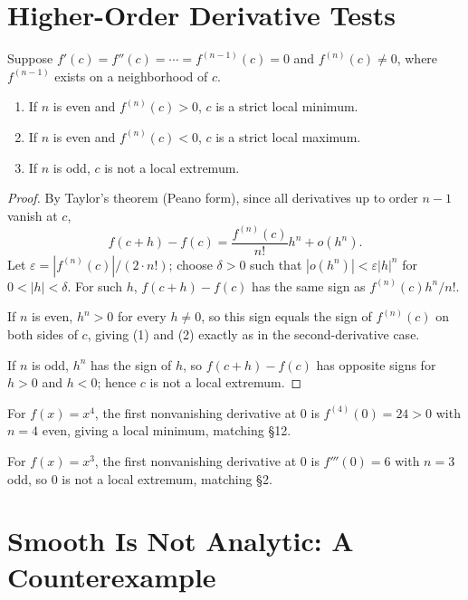 \documentclass{essay}
\begin{document}
\section{Higher-Order Derivative Tests}

\begin{theorem}
Suppose \(f'(c)=f''(c)=\cdots=f^{(n-1)}(c)=0\) and \(f^{(n)}(c)\neq0\),
where \(f^{(n-1)}\) exists on a neighborhood of \(c\).
\begin{enumerate}
    \item If \(n\) is even and \(f^{(n)}(c)>0\), \(c\) is a strict local
    minimum.
    \item If \(n\) is even and \(f^{(n)}(c)<0\), \(c\) is a strict local
    maximum.
    \item If \(n\) is odd, \(c\) is not a local extremum.
\end{enumerate}
\end{theorem}

\begin{proof}
By Taylor's theorem (Peano form), since all derivatives up to order
\(n-1\) vanish at \(c\),
\[
f(c+h)-f(c)=\frac{f^{(n)}(c)}{n!}h^n+o(h^n).
\]
Let \(\varepsilon=|f^{(n)}(c)|/(2\cdot n!)\); choose \(\delta>0\) such that
\(|o(h^n)|<\varepsilon|h|^n\) for \(0<|h|<\delta\). For such \(h\),
\(f(c+h)-f(c)\) has the same sign as \(f^{(n)}(c)h^n/n!\).

If \(n\) is even, \(h^n>0\) for every \(h\neq0\), so this sign equals the
sign of \(f^{(n)}(c)\) on both sides of \(c\), giving (1) and (2) exactly
as in the second-derivative case.

If \(n\) is odd, \(h^n\) has the sign of \(h\), so \(f(c+h)-f(c)\) has
opposite signs for \(h>0\) and \(h<0\); hence \(c\) is not a local
extremum.
\end{proof}

\begin{example}
For \(f(x)=x^4\), the first nonvanishing derivative at \(0\) is
\(f^{(4)}(0)=24>0\) with \(n=4\) even, giving a local minimum, matching
\S 12.
\end{example}

\begin{example}
For \(f(x)=x^3\), the first nonvanishing derivative at \(0\) is
\(f'''(0)=6\) with \(n=3\) odd, so \(0\) is not a local extremum, matching
\S 2.
\end{example}

\section{Smooth Is Not Analytic: A Counterexample}
\end{document}
